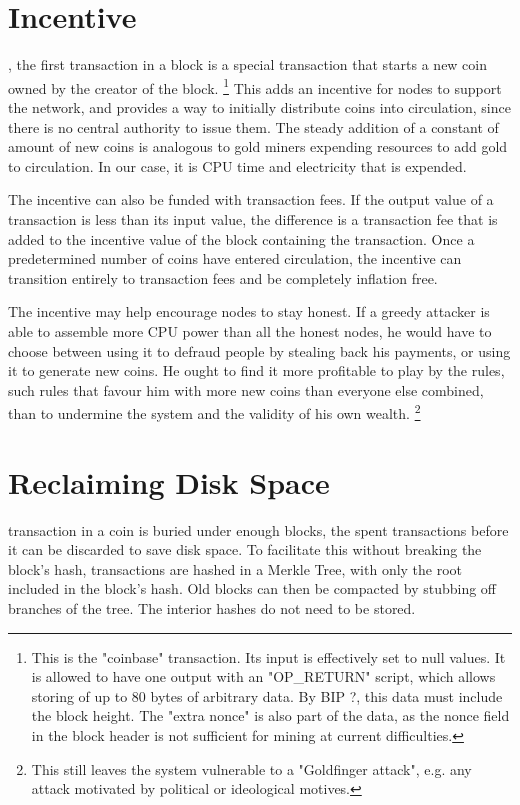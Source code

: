 \documentclass[nohyper]{tufte-handout}
\begin{document}
\section{Incentive}\label{incentive}

, the first transaction in a block is a special transaction
that starts a new coin owned by the creator of the block.  \footnote{This is the "coinbase" transaction.  Its input is effectively set to null values.  It is allowed to have one output with an "OP\_RETURN" script, which allows storing of up to 80 bytes of arbitrary data.  By BIP ?, this data must include the block height.  The "extra nonce" is also part of the data, as the nonce field in the block header is not sufficient for mining at current difficulties.} This adds an
incentive for nodes to support the network, and provides a way to
initially distribute coins into circulation, since there is no central
authority to issue them. The steady addition of a constant of amount of
new coins is analogous to gold miners expending resources to add gold to
circulation. In our case, it is CPU time and electricity that is
expended.

The incentive can also be funded with transaction fees. If the output
value of a transaction is less than its input value, the difference is a
transaction fee that is added to the incentive value of the block
containing the transaction. Once a predetermined number of coins have
entered circulation, the incentive can transition entirely to
transaction fees and be completely inflation free.

The incentive may help encourage nodes to stay honest. If a greedy
attacker is able to assemble more CPU power than all the honest nodes,
he would have to choose between using it to defraud people by stealing
back his payments, or using it to generate new coins. He ought to find
it more profitable to play by the rules, such rules that favour him with
more new coins than everyone else combined, than to undermine the system
and the validity of his own wealth.  \footnote[][-1in]{This still leaves the system vulnerable to a "Goldfinger attack", e.g. any attack motivated by political or ideological motives.}

\section{Reclaiming Disk Space}\label{reclaiming-disk-space}

 transaction in a coin is buried under enough blocks, the
spent transactions before it can be discarded to save disk space. To
facilitate this without breaking the block's hash, transactions are
hashed in a Merkle Tree\cite[-1.7in]{mer80}\cite[-1.1in]{mas99}\cite[-0.25in]{hab97}, with only the root included in the block's hash. Old
blocks can then be compacted by stubbing off branches of the tree. The
interior hashes do not need to be stored.
\end{document}
